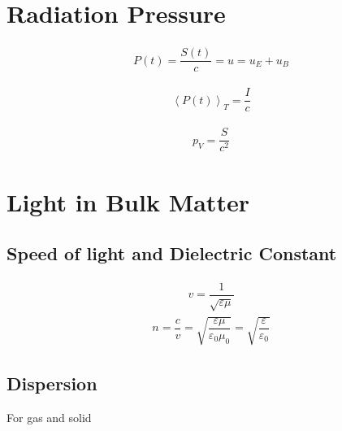 \section{Radiation Pressure}

\begin{equation*}
  \begin{aligned}
    P(t) = \dfrac{S(t)}{c} = u = u_E + u_B
  \end{aligned}
\end{equation*}

\begin{equation*}
  \begin{aligned}
    \left< P(t) \right>_T = \dfrac{I}{c} 
  \end{aligned}
\end{equation*}

\begin{equation*}
  \begin{aligned}
    p_V = \dfrac{S}{c^{2}} 
  \end{aligned}
\end{equation*}

\section{Light in Bulk Matter}

\subsection{Speed of light and Dielectric Constant}

\begin{equation*}
  \begin{aligned}
    v = \dfrac{1}{\sqrt{\varepsilon \mu}} 
  \end{aligned}
\end{equation*}
\begin{equation*}
  \begin{aligned}
    n = \dfrac{c}{v} = \sqrt{\dfrac{\varepsilon \mu}{\varepsilon_0 \mu_0} } = \sqrt{\dfrac{\varepsilon}{\varepsilon_0} }
  \end{aligned}
\end{equation*}

\subsection{Dispersion}

For gas and solid


